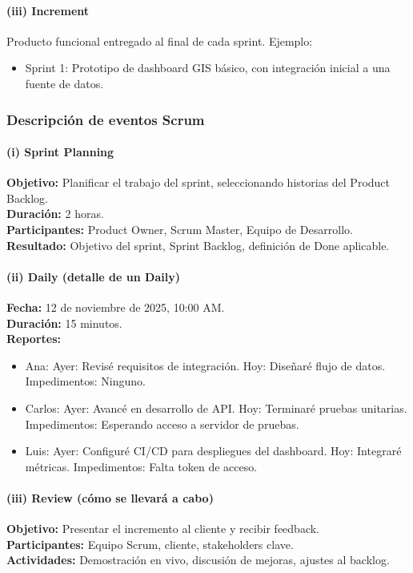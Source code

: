 \paragraph{(iii) Increment}
Producto funcional entregado al final de cada sprint. Ejemplo:
\begin{itemize}
  \item Sprint 1: Prototipo de dashboard GIS básico, con integración inicial a una fuente de datos.
\end{itemize}

\subsubsection{Descripción de eventos Scrum}

\paragraph{(i) Sprint Planning}
\textbf{Objetivo:} Planificar el trabajo del sprint, seleccionando historias del Product Backlog. \\
\textbf{Duración:} 2 horas. \\
\textbf{Participantes:} Product Owner, Scrum Master, Equipo de Desarrollo. \\
\textbf{Resultado:} Objetivo del sprint, Sprint Backlog, definición de Done aplicable.

\paragraph{(ii) Daily (detalle de un Daily)}
\textbf{Fecha:} 12 de noviembre de 2025, 10:00 AM. \\
\textbf{Duración:} 15 minutos. \\
\textbf{Reportes:}
\begin{itemize}
  \item Ana: Ayer: Revisé requisitos de integración. Hoy: Diseñaré flujo de datos. Impedimentos: Ninguno.
  \item Carlos: Ayer: Avancé en desarrollo de API. Hoy: Terminaré pruebas unitarias. Impedimentos: Esperando acceso a servidor de pruebas.
  \item Luis: Ayer: Configuré CI/CD para despliegues del dashboard. Hoy: Integraré métricas. Impedimentos: Falta token de acceso.
\end{itemize}

\paragraph{(iii) Review (cómo se llevará a cabo)}
\textbf{Objetivo:} Presentar el incremento al cliente y recibir feedback. \\
\textbf{Participantes:} Equipo Scrum, cliente, stakeholders clave. \\
\textbf{Actividades:} Demostración en vivo, discusión de mejoras, ajustes al backlog.

